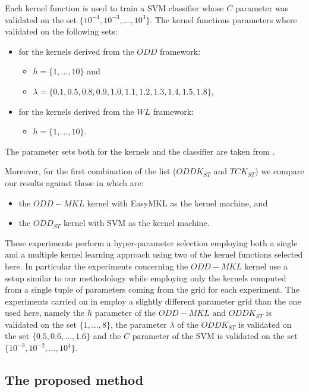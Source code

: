 Each kernel function is used to train a SVM classifier whose $C$ parameter
was validated on the set $\{10^{-4},10^{-3},\dots,10^3\}$.
The kernel functions parameters where validated on the following sets:
\begin{itemize}
    \item for the kernels derived from the $ODD$ framework:
    \begin{itemize}
        \item $h=\{1,\dots,10\}$ and 
        \item $\lambda=\{0.1, 0.5, 0.8, 0.9, 1.0, 1.1, 1.2, 1.3, 1.4, 1.5, 1.8\}$,
    \end{itemize}
    \item for the kernels derived from the $WL$ framework:
    \begin{itemize}
        \item $h=\{1,\dots,10\}$.
    \end{itemize}
\end{itemize}
The parameter sets both for the kernels and the classifier are taken from \cite{rtesselli}.

Moreover, for the first combination of the list ($ODDK_{ST}$ and $TCK_{ST}$)
we compare our results against those in \cite{gmkl} which are:

\begin{itemize}
    \item the $ODD-MKL$ kernel with EasyMKL as the kernel machine, and
    \item the $ODD_{ST}$ kernel with SVM as the kernel machine.
\end{itemize}

These experiments perform a hyper-parameter selection employing both a single and 
a multiple kernel learning approach using two of the kernel functions selected here.
In particular the experiments concerning the $ODD-MKL$ kernel use a setup similar to
our methodology while employing only the kernels computed from a single tuple of
parameters coming from the grid for each experiment.
The experiments carried on in \cite{gmkl} employ a slightly different parameter grid
than the one used here, namely the $h$ parameter of the $ODD-MKL$ and $ODDK_{ST}$ is
validated on the set $\{1,\dots,8\}$, the parameter $\lambda$ of the $ODDK_{ST}$ is 
validated on the set $\{0.5,0.6,\dots,1.6\}$ and the $C$ parameter of the SVM
is validated on the set $\{10^{-3},10^{-2},\dots,10^4\}$.

\subsection{The proposed method}
\label{subsec:firstg}

